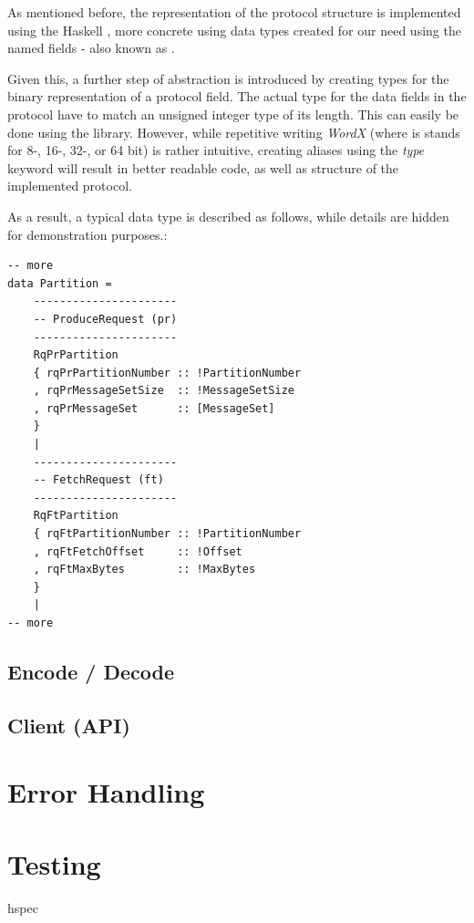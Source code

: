 As mentioned before, the representation of the protocol structure is
implemented using the Haskell , more concrete using data types created
for our need using the named fields - also known as .

Given this, a further step of abstraction is introduced by creating types for
the binary representation of a protocol field. The actual type for the data
fields in the protocol have to match an unsigned integer type of its length.
This can easily be done using the
library. However, while repetitive writing \textit{WordX} (where is stands for
8-, 16-, 32-, or 64 bit) is rather intuitive, creating aliases using the
\textit{type} keyword will result in better readable code, as well as structure
of the implemented protocol.

As a result, a typical data type is described as follows, while details are
hidden for demonstration purposes.:

\begin{lstlisting}
-- more
data Partition =
    ----------------------
    -- ProduceRequest (pr)
    ----------------------
    RqPrPartition
    { rqPrPartitionNumber :: !PartitionNumber
    , rqPrMessageSetSize  :: !MessageSetSize
    , rqPrMessageSet      :: [MessageSet]
    }
    |
    ----------------------
    -- FetchRequest (ft)
    ----------------------
    RqFtPartition
    { rqFtPartitionNumber :: !PartitionNumber
    , rqFtFetchOffset     :: !Offset
    , rqFtMaxBytes        :: !MaxBytes
    }
    |
-- more
\end{lstlisting}

\subsection{Encode / Decode}

\subsection{Client (API)}

\section{Error Handling}

\section{Testing}
hspec 

